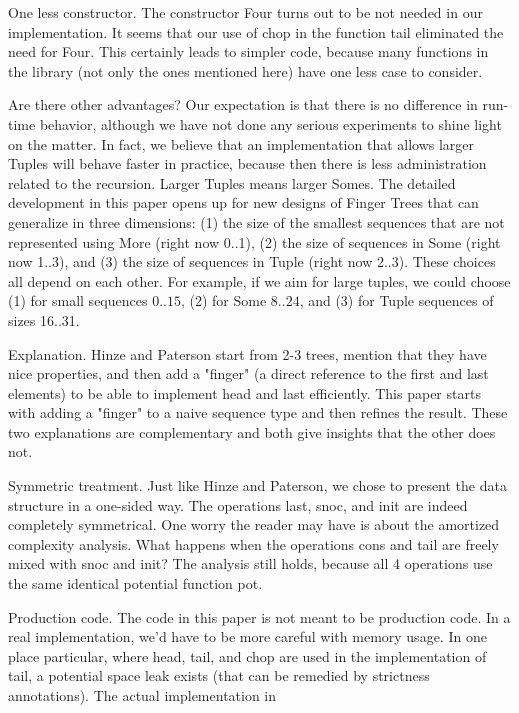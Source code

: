 \documentclass[10pt]{article}
\begin{document}
One less constructor. The constructor Four turns out to be not needed in our implementation. It seems that our use of chop in the function tail eliminated the need for Four. This certainly leads to simpler code, because many functions in the library (not only the ones mentioned here) have one less case to consider.

Are there other advantages? Our expectation is that there is no difference in run-time behavior, although we have not done any serious experiments to shine light on the matter. In fact, we believe that an implementation that allows larger Tuples will behave faster in practice, because then there is less administration related to the recursion. Larger Tuples means larger Somes. The detailed development in this paper opens up for new designs of Finger Trees that can generalize in three dimensions: (1) the size of the smallest sequences that are not represented using More (right now 0..1), (2) the size of sequences in Some (right now 1..3), and (3) the size of sequences in Tuple (right now 2..3). These choices all depend on each other. For example, if we aim for large tuples, we could choose (1) for small sequences $0 . .15$, (2) for Some $8 . .24$, and (3) for Tuple sequences of sizes 16..31.

Explanation. Hinze and Paterson start from 2-3 trees, mention that they have nice properties, and then add a "finger" (a direct reference to the first and last elements) to be able to implement head and last efficiently. This paper starts with adding a "finger" to a naive sequence type and then refines the result. These two explanations are complementary and both give insights that the other does not.

Symmetric treatment. Just like Hinze and Paterson, we chose to present the data structure in a one-sided way. The operations last, snoc, and init are indeed completely symmetrical. One worry the reader may have is about the amortized complexity analysis. What happens when the operations cons and tail are freely mixed with snoc and init? The analysis still holds, because all 4 operations use the same identical potential function pot.

Production code. The code in this paper is not meant to be production code. In a real implementation, we'd have to be more careful with memory usage. In one place particular, where head, tail, and chop are used in the implementation of tail, a potential space leak exists (that can be remedied by strictness annotations). The actual implementation in
\end{document}
